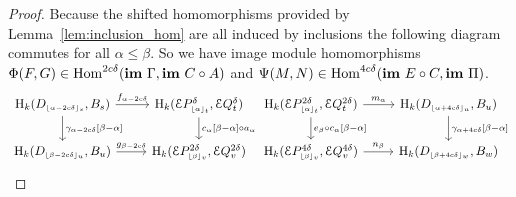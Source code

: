 \begin{proof}
  Because the shifted homomorphisms provided by Lemma~\ref{lem:inclusion_hom} are all induced by inclusions the following diagram commutes for all $\alpha\leq\beta$.
  So we have image module homomorphisms $\Phi(F, G)\in\mathrm{Hom}^{2c\delta}(\mathbf{im}~\Gamma, \mathbf{im}~C\circ A)$ and $\Psi(M, N)\in\mathrm{Hom}^{4c\delta}(\mathbf{im}~E\circ C, \mathbf{im}~\Pi)$.
  \[\begin{tikzcd}
      \hom_k(D\subi{s}{\alpha-2c\delta}, B_s) \arrow{r}{f_{\alpha-2c\delta}}\arrow{d}{\gamma_{\alpha-2c\delta}[\beta-\alpha]} &
      \hom_k(\E P\subi{t}{\alpha}^\delta, \E Q_t^\delta)\arrow{d}{c_\alpha[\beta-\alpha]\circ a_\alpha}\\
      \hom_k(D\subi{u}{\beta-2c\delta}, B_u)\arrow{r}{g_{\beta-2c\delta}} &
      \hom_k(\E P\subi{v}{\beta}^{2\delta}, \E Q_v^{2\delta})
    \end{tikzcd}
    \begin{tikzcd}
      \hom_k(\E P\subi{t}{\alpha}^{2\delta}, \E Q_t^{2\delta})\arrow{d}{e_\beta\circ c_\alpha[\beta-\alpha]}\arrow{r}{m_{\alpha}} &
      \hom_k(D\subi{u}{\alpha+4c\delta}, B_u)\arrow{d}{\gamma_{\alpha+4c\delta}[\beta-\alpha]}\\
      \hom_k(\E P\subi{v}{\beta}^{4\delta}, \E Q_v^{4\delta})\arrow{r}{n_\beta} &
      \hom_k(D\subi{w}{\beta+4c\delta}, B_w)
    \end{tikzcd}\]


\end{proof}
